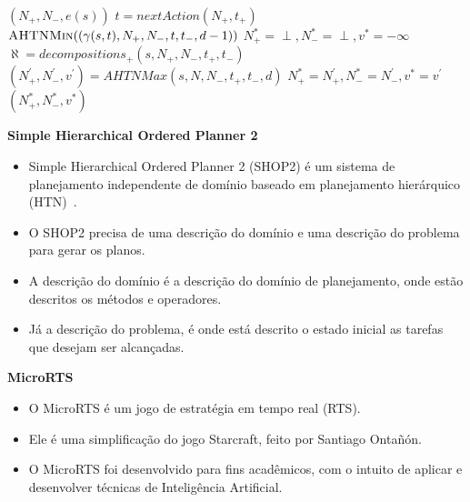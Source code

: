 \documentclass[a0,portrait]{a0poster}
\begin{document}
\begin{multicols}{2}
\vspace{10mm}

{\small
\begin{algorithmic}[1]
	\label{alg:lin:firstLine}
	\State	\Return $(N_{+}, N_{-}, e(s))$
	\EndIf
	 \label{alg:ahtn:nexaction}
	\State $t = nextAction(N_{+}, t_{+})$ 
	\State \Return $\Call{AHTNMin}{(\gamma(s,t), N_{+}, N_{-}, t, t_{-}, d-1)}$ \label{alg:ahtn:troca}
	\EndIf
	\State $N_{+}^{*} = \perp, N_{-}^{*} = \perp, v^{*} = -\infty$
	\State $\aleph = decompositions_{+}(s, N_{+}, N_{-}, t_{+}, t_{-})$ \label{alg:decompositions}
	 \label{alg:ahtn:for}
	\State $(N^{'}_{+}, N^{'}_{-}, v^{'}) = AHTNMax(s, N, N_{-}, t_{+}, t_{-}, d)$
	\State $N_{+}^{*} = N^{'}_{+}, N_{-}^{*} = N^{'}_{-}, v^{*} = v^{'} $
	\EndIf
	\EndFor		
	\State \Return $(N_{+}^{*}, N_{-}^{*}, v^{*} )$
	\EndFunction
\end{algorithmic}
}

\vspace{15mm}
\textbf{Simple Hierarchical Ordered Planner 2}
\begin{itemize}
	[leftmargin=2em]\itemadjust
	\item Simple Hierarchical Ordered Planner 2 (SHOP2) \'e um sistema de planejamento independente de dom\'inio baseado em planejamento hier\'arquico (HTN)~\cite{nau2003shop2}.
	\item O SHOP2 precisa de uma descrição do dom\'inio e uma descrição do problema para gerar os planos.
	\item A descrição do dom\'inio é a descri\c{c}\~ao do dom\'inio de planejamento, onde estão descritos os m\'etodos e operadores.
	\item Já a descrição do problema, é onde está descrito o estado inicial as tarefas que desejam ser alcançadas.
\end{itemize}


\vspace{15mm}
\textbf{MicroRTS}


\begin{itemize}
	[leftmargin=2em]\itemadjust
	\item O MicroRTS \'e um jogo de estrat\'egia em tempo real (RTS).
	\item Ele \'e uma simplifica\c{c}\~ao do jogo Starcraft, feito por Santiago Onta\~n\'on.
	\item O MicroRTS foi desenvolvido para fins acad\^emicos, com o intuito de aplicar e desenvolver t\'ecnicas de Intelig\^encia Artificial.
\end{itemize}


\end{multicols}
\end{document}
